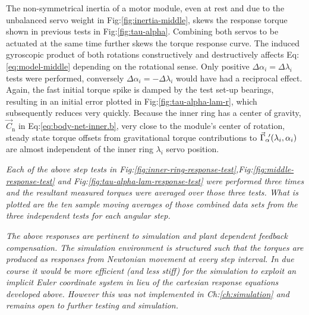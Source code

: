 \par
The non-symmetrical inertia of a motor module, even at rest and due to the unbalanced servo weight in Fig:\ref{fig:inertia-middle}, skews the response torque shown in previous tests in Fig:\ref{fig:tau-alpha}. Combining both servos to be actuated at the same time further skews the torque response curve. The induced gyroscopic product of both rotations constructively and destructively affects Eq:\ref{eq:model-middle} depending on the rotational sense. Only positive $\Delta\alpha_i=\Delta\lambda_i$ tests were performed, conversely $\Delta\alpha_i=-\Delta\lambda_i$ would have had a reciprocal effect. Again, the fast initial torque spike is damped by the test set-up bearings, resulting in an initial error plotted in Fig:\ref{fig:tau-alpha-lam-r}, which subsequently reduces very quickly. Because the inner ring has a center of gravity, $\vec{C}_\text{n}$ in Eq:\ref{eq:body-net-inner.b}, very close to the module's center of rotation, steady state torque offsets from gravitational torque contributions to $\vec{\Gamma}_\alpha\hspace{-2pt}'(\lambda_i,\alpha_i)$ are almost independent of the inner ring $\lambda_i$ servo position. 
\par
\emph{\color{Gray} Each of the above step tests in Fig:\ref{fig:inner-ring-response-test},Fig:\ref{fig:middle-response-test} and Fig:\ref{fig:tau-alpha-lam-response-test} were performed three times and the resultant measured torques were averaged over those three tests. What is plotted are the ten sample moving averages of those combined data sets from the three independent tests for each angular step.}
\par
\emph{\color{Gray}The above responses are pertinent to simulation and plant dependent feedback compensation. The simulation environment is structured such that the torques are produced as responses from Newtonian movement at every step interval. In due course it would be more efficient (and less stiff) for the simulation to exploit an implicit Euler\cite{physicallybased,multibodydynamics} coordinate system in lieu of the cartesian response equations developed above. However this was not implemented in Ch:\ref{ch:simulation} and remains open to further testing and simulation.}
